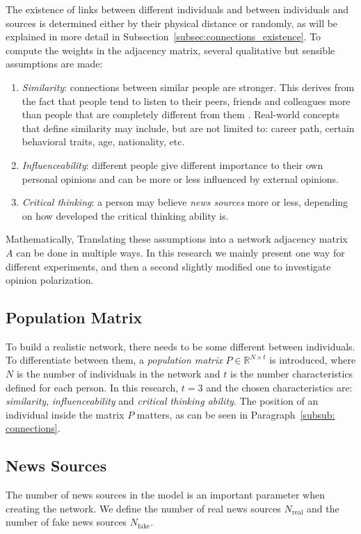 The existence of links between different individuals and between individuals and sources is determined either by their physical distance or randomly, as will be explained in more detail in Subsection~\ref{subsec:connections_existence}.
To compute the weights in the adjacency matrix, several qualitative but sensible assumptions are made:
\renewcommand{\theenumi}{\roman{enumi}}
\begin{enumerate}
\item \textit{Similarity}: connections between similar people are stronger. This derives from the fact that people tend to listen to their peers, friends and colleagues more than people that are completely different from them \cite{Youyou2017}\cite{Afifi2013}. Real-world concepts that define similarity may include, but are not limited to: career path, certain behavioral traits, age, nationality, etc.
\item \textit{Influenceability}: different people give different importance to their own personal opinions and can be more or less influenced by external opinions.
\item \textit{Critical thinking}: a person may believe \textit{news sources} more or less, depending on how developed the critical thinking ability  is.
\end{enumerate}
Mathematically, 
Translating these assumptions into a network adjacency matrix $A$ can be done in multiple ways. In this research we mainly present one way for different experiments, and then a second slightly modified one to investigate opinion polarization. 
\subsection{Population Matrix}
To build a realistic network, there needs to be some different between individuals. To differentiate between them, a \textit{population matrix} $P \in \mathbb{R}^{N \times t}$ is introduced, where $N$ is the number of individuals in the network and $t$ is the number characteristics defined for each person. In this research, $t=3$ and the chosen characteristics are: \textit{similarity}, \textit{influenceability} and \textit{critical thinking ability}. The position of an individual inside the matrix $P$ matters, as can be seen in Paragraph~\ref{subsub: connections}.
\subsection{News Sources}
The number of news sources in the model is an important parameter when creating the network. We define the number of real news sources $N_{\text{real}}$ and the number of fake news sources $N_{\text{fake}}$.
